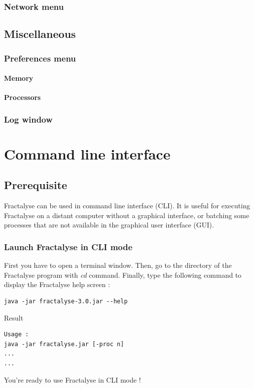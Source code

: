 \documentclass[a4paper,10pt]{report}
\begin{document}
\section{Network menu}

\chapter{Miscellaneous}
\section{Preferences menu}
\subsection{Memory}

\subsection{Processors}

\section{Log window}



\part{Command line interface}

\chapter{Prerequisite}

Fractalyse can be used in command line interface (CLI).
It is useful for executing Fractalyse on a distant computer without a graphical interface, or batching some processes that are not available in the graphical user interface (GUI).

\section{Launch Fractalyse in CLI mode}
First you have to open a terminal window.
Then, go to the directory of the Fractalyse program with \textit{cd} command.
Finally, type the following command to display the Fractalyse help screen :
\begin{Verbatim}
java -jar fractalyse-3.0.jar --help
\end{Verbatim}
Result
\begin{Verbatim}
Usage :
java -jar fractalyse.jar [-proc n]
...
...
\end{Verbatim}
You're ready to use Fractalyse in CLI mode !
\end{document}
